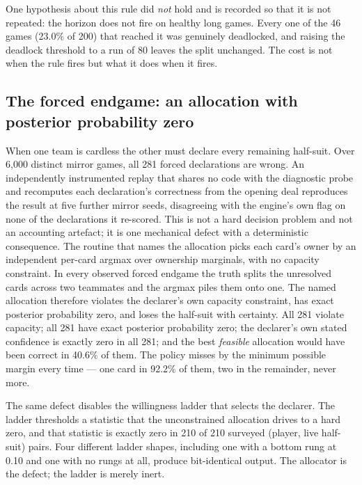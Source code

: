 \documentclass[11pt]{article}
\theoremstyle{definition}
\providecommand{\numForcedGames}{6{,}000}
\providecommand{\numForcedN}{281}
\providecommand{\numForcedMissRate}{92.2}
\providecommand{\numFeasibleRight}{40.6}
\providecommand{\numRungZeroPairs}{210}
\providecommand{\numLadderBottomRung}{0.10}
\providecommand{\numHorizonReach}{23.0}
\providecommand{\numLowConfGames}{200}
\providecommand{\numHorizonGames}{46}
\begin{document}
One hypothesis about this rule did \emph{not} hold and is recorded so that it is
not repeated: the horizon does not fire on healthy long games. Every one of the
\numHorizonGames{} games (\numHorizonReach\% of \numLowConfGames{}) that reached it was genuinely deadlocked,
and raising the deadlock threshold to a run of 80 leaves the split unchanged. The
cost is not when the rule fires but what it does when it fires.

\subsection{The forced endgame: an allocation with posterior probability zero}
\label{sec:diag-forced}

When one team is cardless the other must declare every remaining half-suit. Over
\numForcedGames{} distinct mirror games, all \numForcedN{} forced declarations
are wrong. An independently instrumented replay that shares no code with the
diagnostic probe and recomputes each declaration's correctness from the opening
deal reproduces the result at five further mirror seeds, disagreeing with the
engine's own flag on none of the declarations it re-scored.
This is not a hard decision problem and not an accounting artefact; it is one
mechanical defect with a deterministic consequence. The routine that names the
allocation picks each card's owner by an independent per-card argmax over
ownership marginals, with no capacity constraint. In every observed forced
endgame the truth splits the unresolved cards across two teammates and the argmax
piles them onto one. The named allocation therefore violates the declarer's own
capacity constraint, has exact posterior probability zero, and loses the
half-suit with certainty. All \numForcedN{} violate capacity; all
\numForcedN{} have exact posterior probability zero; the declarer's own stated
confidence is exactly zero in all \numForcedN{}; and the best \emph{feasible}
allocation would have been correct in \numFeasibleRight\% of them. The policy
misses by the minimum possible margin every time --- one card in
\numForcedMissRate\% of them, two in the remainder, never more.

The same defect disables the willingness ladder that selects the declarer. The
ladder thresholds a statistic that the unconstrained allocation drives to a hard
zero, and that statistic is exactly zero in \numRungZeroPairs{} of
\numRungZeroPairs{} surveyed (player, live half-suit) pairs. Four different
ladder shapes, including one with a bottom rung at \numLadderBottomRung{} and one with no rungs at
all, produce bit-identical output. The allocator is the defect; the ladder is
merely inert.
\end{document}
